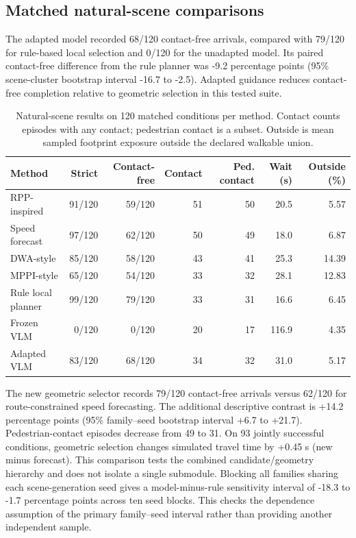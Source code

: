 \documentclass[10pt,a4paper]{article}
\begin{document}
\subsection{Matched natural-scene comparisons}
The adapted model recorded 68/120 contact-free arrivals, compared with 79/120 for rule-based local selection and 0/120 for the unadapted model. Its paired contact-free difference from the rule planner was -9.2 percentage points (95\% scene-cluster bootstrap interval -16.7 to -2.5). Adapted guidance reduces contact-free completion relative to geometric selection in this tested suite.
\begin{table}[tb]\centering\small\caption{Natural-scene results on 120 matched conditions per method. Contact counts episodes with any contact; pedestrian contact is a subset. Outside is mean sampled footprint exposure outside the declared walkable union.}\begin{tabular}{lrrrrrr}\toprule
Method & Strict & Contact-free & Contact & Ped. contact & Wait (s) & Outside (\%) \\ \midrule
RPP-inspired & 91/120 & 59/120 & 51 & 50 & 20.5 & 5.57 \\
Speed forecast & 97/120 & 62/120 & 50 & 49 & 18.0 & 6.87 \\
DWA-style & 85/120 & 58/120 & 43 & 41 & 25.3 & 14.39 \\
MPPI-style & 65/120 & 54/120 & 33 & 32 & 28.1 & 12.83 \\
Rule local planner & 99/120 & 79/120 & 33 & 31 & 16.6 & 6.45 \\
Frozen VLM & 0/120 & 0/120 & 20 & 17 & 116.9 & 4.35 \\
Adapted VLM & 83/120 & 68/120 & 34 & 32 & 31.0 & 5.17 \\
\bottomrule\end{tabular}\end{table}
The new geometric selector records 79/120 contact-free arrivals versus 62/120 for route-constrained speed forecasting. The additional descriptive contrast is +14.2 percentage points (95\% family--seed bootstrap interval +6.7 to +21.7). Pedestrian-contact episodes decrease from 49 to 31. On 93 jointly successful conditions, geometric selection changes simulated travel time by +0.45 s (new minus forecast). This comparison tests the combined candidate/geometry hierarchy and does not isolate a single submodule.
Blocking all families sharing each scene-generation seed gives a model-minus-rule sensitivity interval of -18.3 to -1.7 percentage points across ten seed blocks. This checks the dependence assumption of the primary family--seed interval rather than providing another independent sample.
\end{document}
